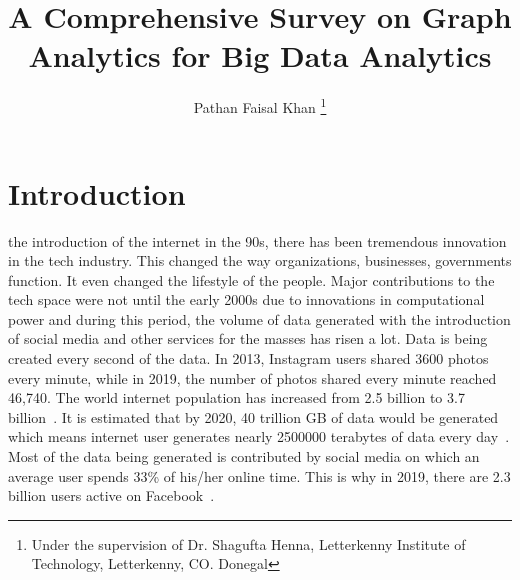 \documentclass[journal,twoside,web]{ieeecolor}
\begin{document}
\title{A Comprehensive Survey on Graph Analytics for Big Data Analytics}
\author{Pathan Faisal Khan
\thanks{Under the supervision of Dr. Shagufta Henna, Letterkenny Institute of Technology, Letterkenny, CO. Donegal}
}


\maketitle

\section{Introduction}
\label{sec:introduction}
 the introduction of the internet in the 90s, there has been tremendous innovation in the tech industry. This changed the way organizations, businesses, governments function. It even changed the lifestyle of the people. Major contributions to the tech space were not until the early 2000s due to innovations in computational power and during this period, the volume of data generated with the introduction of social media and other services for the masses has risen a lot. Data is being created every second of the data. In 2013, Instagram users shared 3600 photos every minute, while in 2019, the number of photos shared every minute reached 46,740. The world internet population has increased from 2.5 billion to 3.7 billion~\cite{1}. It is estimated that by 2020, 40 trillion GB of data would be generated~\cite{2} which means internet user generates nearly 2500000 terabytes of data every day~\cite{1}. Most of the data being generated is contributed by social media on which an average user spends 33\% of his/her online time. This is why in 2019, there are 2.3 billion users active on Facebook~\cite{3}.
\end{document}
